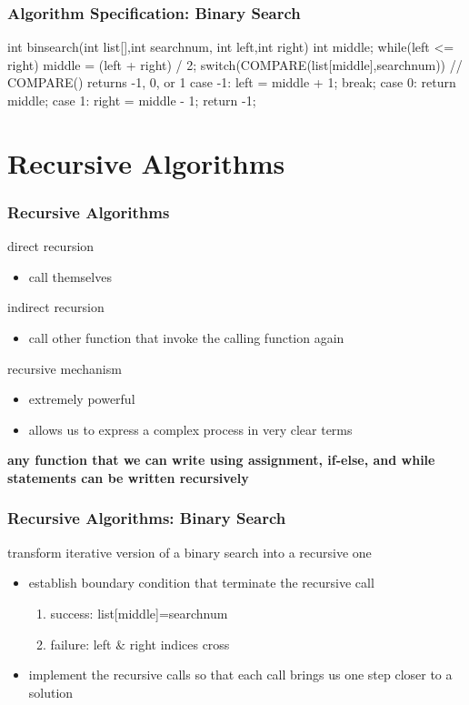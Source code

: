 \documentclass[newPxFont,sthlmFooter,nooffset]{beamer}
\begin{document}
\begin{frame}[t, fragile]
  \frametitle{Algorithm Specification: Binary Search}
\begin{codedef}
int binsearch(int list[],int searchnum,
                        int left,int right) {
   int middle;
   while(left <= right) {
      middle = (left + right) / 2; 
      switch(COMPARE(list[middle],searchnum)) { 
         // COMPARE() returns -1, 0, or 1
         case -1: left = middle + 1;
                  break;
         case  0: return middle;
         case  1: right = middle - 1;
      }
   }
   return -1; 
}
\end{codedef}
\end{frame}

\section{Recursive Algorithms}
\begin{frame}[t]
  \frametitle{Recursive Algorithms}
direct recursion
\begin{itemize}
\item call themselves
\end{itemize}

indirect recursion
\begin{itemize}
\item call other function that invoke the calling function again
\end{itemize}

recursive mechanism
\begin{itemize}
\item extremely powerful
\item allows us to express a complex process in very clear terms
\end{itemize}

\textbf{any function that we can write using assignment, if-else, and while statements can be written recursively}
\end{frame}

\begin{frame}[t]
  \frametitle{Recursive Algorithms: Binary Search}
transform iterative version of a binary search into a recursive one
\begin{itemize}
\item establish boundary condition that terminate the recursive call
  \begin{enumerate}
  \item success: list[middle]=searchnum
  \item failure: left $\&$ right indices cross
  \end{enumerate}
\item implement the recursive calls so that each call brings us one
  step closer to a solution
\end{itemize}
\end{frame}
\end{document}
